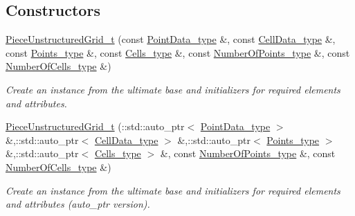\subsection*{Constructors}
\begin{DoxyCompactItemize}
\item 
\hyperlink{classPieceUnstructuredGrid__t_a9d30b76eb9efa7565011da966d5c0df7}{Piece\-Unstructured\-Grid\-\_\-t} (const \hyperlink{classPieceUnstructuredGrid__t_a5d79d8ea03ca53f80f24e62c2175ec02}{Point\-Data\-\_\-type} \&, const \hyperlink{classPieceUnstructuredGrid__t_a4232a7b88477ee6f692a4e5fab6a65d1}{Cell\-Data\-\_\-type} \&, const \hyperlink{classPieceUnstructuredGrid__t_a7747b159a3d1eee8d02a0eefaa235711}{Points\-\_\-type} \&, const \hyperlink{classPieceUnstructuredGrid__t_aca1ec38eff08bde0cd115c54dbb7a20f}{Cells\-\_\-type} \&, const \hyperlink{classPieceUnstructuredGrid__t_a8df1cd0d138d990e166d325ceed9a660}{Number\-Of\-Points\-\_\-type} \&, const \hyperlink{classPieceUnstructuredGrid__t_aeae5546900c50a4abe9b3aea485e97d0}{Number\-Of\-Cells\-\_\-type} \&)
\begin{DoxyCompactList}\small\item\em Create an instance from the ultimate base and initializers for required elements and attributes. \end{DoxyCompactList}\item 
\hyperlink{classPieceUnstructuredGrid__t_a2b90af1916dfe3153cb1d630af5af490}{Piece\-Unstructured\-Grid\-\_\-t} (\-::std\-::auto\-\_\-ptr$<$ \hyperlink{classPieceUnstructuredGrid__t_a5d79d8ea03ca53f80f24e62c2175ec02}{Point\-Data\-\_\-type} $>$ \&,\-::std\-::auto\-\_\-ptr$<$ \hyperlink{classPieceUnstructuredGrid__t_a4232a7b88477ee6f692a4e5fab6a65d1}{Cell\-Data\-\_\-type} $>$ \&,\-::std\-::auto\-\_\-ptr$<$ \hyperlink{classPieceUnstructuredGrid__t_a7747b159a3d1eee8d02a0eefaa235711}{Points\-\_\-type} $>$ \&,\-::std\-::auto\-\_\-ptr$<$ \hyperlink{classPieceUnstructuredGrid__t_aca1ec38eff08bde0cd115c54dbb7a20f}{Cells\-\_\-type} $>$ \&, const \hyperlink{classPieceUnstructuredGrid__t_a8df1cd0d138d990e166d325ceed9a660}{Number\-Of\-Points\-\_\-type} \&, const \hyperlink{classPieceUnstructuredGrid__t_aeae5546900c50a4abe9b3aea485e97d0}{Number\-Of\-Cells\-\_\-type} \&)
\begin{DoxyCompactList}\small\item\em Create an instance from the ultimate base and initializers for required elements and attributes (auto\-\_\-ptr version). \end{DoxyCompactList}\item 

\end{DoxyCompactItemize}
